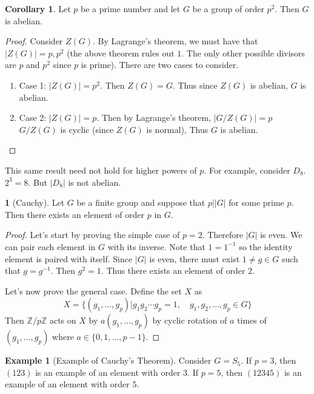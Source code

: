 \documentclass[12pt]{article}
\theoremstyle{definition}
\newtheorem{theorem}{\color{ForestGreen}{\textbf{Theorem}}}
\newtheorem{corollary}{Corollary}
\newcommand{\Z}{\mathbb{Z}}
\newtheorem{example}{\color{WildStrawberry}Example}
\theoremstyle{definition}
\begin{document}
\begin{corollary}
	Let $p$ be a prime number and let $G$ be a group of order $p^2$. Then $G$ is abelian.
\end{corollary}
\begin{proof}	
	Consider $Z(G)$. By Lagrange's theorem, we must have that $|Z(G)| = p, p^2$ (the above theorem rules out $1$. The only other possible divisors are $p$ and $p^2$ since $p$ is prime). There are two cases to consider.
	\begin{enumerate}
		\item Case 1: $|Z(G)| = p^2$. Then $Z(G) = G$. Thus since $Z(G)$ is abelian, $G$ is abelian.
		\item Case 2: $|Z(G)| = p$. Then by Lagrange's theorem, $| G / Z(G) | = p$ $G / Z(G)$ is cyclic (since $Z(G)$ is normal), Thus $G$ is abelian.
	\end{enumerate}
\end{proof}

This same result need not hold for higher powers of $p$. For example, consider $D_8$. $2^3 = 8$. But $|D_8|$ is not abelian. 

\begin{theorem}[Cauchy]
	Let $G$ be a finite group and suppose that $p \big\vert |G|$ for some prime $p$. Then there exists an element of order $p$ in $G$. 
\end{theorem}

\begin{proof}
	Let's start by proving the simple case of $p=2$. Therefore $|G|$ is even. We can pair each element in $G$ with its inverse. Note that $1 = 1^{-1}$ so the identity element is paired with itself. Since $|G|$ is even, there must exist $1 \neq g \in G$ such that $g = g^{-1}$. Then $g^2 = 1$. Thus there exists an element of order $2$. 

	Let's now prove the general case. Define the set $X$ as 
	\begin{equation}
		X = \{(g_1, \ldots, g_p) | g_1g_2 \cdots g_p = 1, \quad g_1, g_2, \ldots, g_p \in G\}
	\end{equation}
	Then $\Z / p \Z$ acts on $X$ by $a(g_1, \ldots, g_p)$ by cyclic rotation of $a$ times of $(g_1, \ldots, g_p)$ where $a \in \{0,1,\ldots, p-1\}$. 
\end{proof}

\begin{example}[Example of Cauchy's Theorem]
	Consider $G = S_5$. If $p=3$, then $(123)$ is an example of an element with order $3$. If $p=5$, then $(12345)$ is an example of an element with order $5$. 
\end{example}
\end{document}
